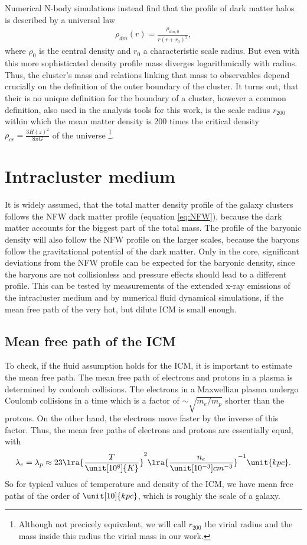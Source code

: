 Numerical N-body simulations instead find that the profile of dark matter halos
is described by a universal law \citep{Navarro1997}
\begin{align}
\rho_{dm}(r)=\frac{\rho_{dm,0}}{r(r+r_0)^2},\label{eq:NFW}
\end{align}
where $\rho_0$ is the central density and $r_0$ a characteristic scale
radius.
But even with this more sophisticated density profile mass diverges
logarithmically with radius. Thus, the cluster’s mass and
relations linking that mass to observables depend crucially on the definition of
the outer boundary of the cluster. It turns out, that their is no unique
definition for the boundary of a cluster, however a common definition, also used
in the analysis tools for this work, is the scale radius $r_{200}$ within which
the mean matter density is 200 times the critical density 
$\rho_{cr}=\frac{3H(z)^2}{8\pi G}$ of the universe \footnote{Although not
precicely equivalent, we will call $r_{200}$ the virial radius and
the mass inside this radius the virial mass in our work.}. 

\section{Intracluster medium}
It is widely assumed, that the total matter density profile of the galaxy
clusters follows the NFW dark matter profile (equation \eqref{eq:NFW}),
because the dark matter accounts for the biggest part of the total mass.
The profile of the baryonic density will also follow the NFW profile on
the larger scales, because the baryons follow the gravitational potential of
the dark matter. Only in the core, significant deviations from the NFW profile
can be expected for the baryonic density, since the baryons are not
collisionless and pressure effects should lead to a different profile.
This can be tested by measurements of the extended x-ray emissions of the
intracluster medium and by numerical fluid dynamical simulations, if the mean
free path of the very hot, but dilute ICM is small enough.  
\subsection{Mean free path of the ICM}\label{mfp}
To check, if the fluid assumption holds for the ICM, it is
important to estimate the mean free path. The mean free path of electrons and
protons in a plasma is determined by coulomb collisions. The electrons in a
Maxwellian plasma undergo Coulomb collisions in a time which is a factor of
$\sim \sqrt{m_e/m_p}$ shorter than the protons. On the other hand, the electrons
move faster by the inverse of this factor. Thus, the mean free paths of
electrons and protons are essentially equal, with \citep{Plionis2008}
\begin{align}
\lambda_e=\lambda_p \approx 23 
\lra{\frac{T}{\unit[10^8]{K}}}^2 
\lra{\frac{n_e}{\unit[10^{-3}]{cm^{-3}}}}^{-1} \unit{kpc}.
\end{align}
So for typical values of temperature and density of the ICM, we have mean free
paths of the order of $\unit[10]{kpc}$, which is roughly the scale of a galaxy.


